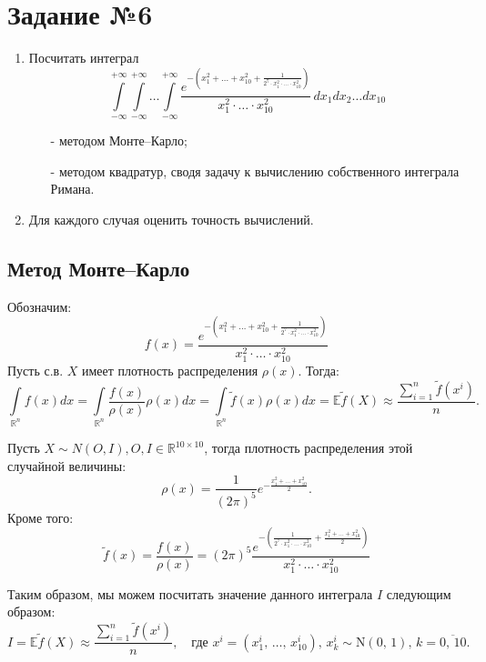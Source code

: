 \documentclass[a4paper, 11pt]{article}
\theoremstyle{def}
\theoremstyle{th}
\theoremstyle{rem}
\begin{document}
\section{Задание №6}
\begin{enumerate}
        \item Посчитать интеграл
$$
        \int\limits_{-\infty}^{+\infty}
        \int\limits_{-\infty}^{+\infty}
        \ldots
        \int\limits_{-\infty}^{+\infty}
        \frac
        {
                e^{-\left(x_1^2 + \ldots +x_{10}^2 + \frac{1}{2^7 \cdot x_1^2 \cdot \ldots \cdot x_{10}^2}\right)}
        }
        {
                x_1^2 \cdot \ldots \cdot x_{10}^2
        }
        \, dx_1 dx_2 \ldots dx_{10}
$$
        \begin{itemize}
                \item[-] методом Монте--Карло;
                \item[-] методом квадратур, сводя задачу к вычислению собственного интеграла Римана.
        \end{itemize}
        \item Для каждого случая оценить точность вычислений.
\end{enumerate}


\subsection{Метод Монте--Карло}
Обозначим:
$$
f(x) = \frac
                {
                        e^{-\left(x_1^2 + \ldots +x_{10}^2 + \frac{1}{2^7 \cdot x_1^2 \cdot \ldots \cdot x_{10}^2}\right)}
                }
                {
                        x_1^2 \cdot \ldots \cdot x_{10}^2
                }
$$
Пусть с.в. $X$ имеет плотность распределения $\rho(x)$. Тогда:
$$
\int\limits_{\mathbb{R}^n}f(x) dx = \int\limits_{\mathbb{R}^n}\dfrac{f(x)}{\rho(x)}\rho(x) dx = \int\limits_{\mathbb{R}^n} \tilde f(x) \rho(x) dx = \mathbb{E}\tilde f(X) \approx \dfrac{\sum\limits_{i=1}^{n}\tilde f(x^i)}{n}.
$$

Пусть $X \sim N(O, I), O, I \in \mathbb{R}^{10 \times 10}$, тогда плотность распределения этой случайной величины:
$$
\rho(x) = \frac{1}{(2\pi)^5}e^{-\frac{x_1^2 + \dots + x_{10}^2}{2}}.
$$
Кроме того: 
$$
\tilde f(x) = \frac{f(x)}{\rho(x)} = (2\pi)^5\dfrac{e^{-\left(\frac{1}{2^7 \cdot x_1^2 \cdot \dots \cdot x_{10}^2} + \frac{x_1^2 + \dots + x_{10}^2}{2}\right)}}{x_1^2\cdot \dots \cdot x_{10}^2}
$$

Таким образом, мы можем посчитать значение данного интеграла $I$ следующим образом:
$$
I = \mathbb{E}\tilde f(X) \approx \dfrac{\sum\limits_{i=1}^{n}\tilde f(x^i)}{n}, \quad
        \mbox{где $x^i = (x_1^i,\,\ldots,\,x_{10}^i)$, $x_k^i\sim\mbox{N}(0,\,1)$, $k = \overline{0,\,10}$.}
$$
\end{document}
